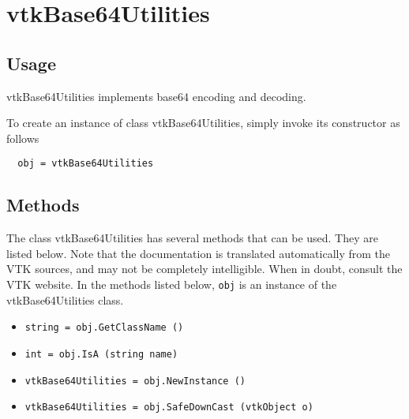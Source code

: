 \section{vtkBase64Utilities}

\subsection{Usage}

 vtkBase64Utilities implements base64 encoding and decoding.

To create an instance of class vtkBase64Utilities, simply
invoke its constructor as follows
\begin{verbatim}
  obj = vtkBase64Utilities
\end{verbatim}
\subsection{Methods}

The class vtkBase64Utilities has several methods that can be used.
  They are listed below.
Note that the documentation is translated automatically from the VTK sources,
and may not be completely intelligible.  When in doubt, consult the VTK website.
In the methods listed below, \verb|obj| is an instance of the vtkBase64Utilities class.
\begin{itemize}
\item  \verb|string = obj.GetClassName ()|

\item  \verb|int = obj.IsA (string name)|

\item  \verb|vtkBase64Utilities = obj.NewInstance ()|

\item  \verb|vtkBase64Utilities = obj.SafeDownCast (vtkObject o)|

\end{itemize}
